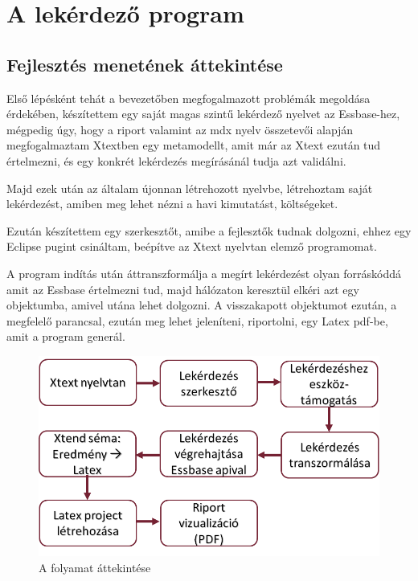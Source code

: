 \chapter{A lekérdező program}\label{sect:Ellaboration}
\section{Fejlesztés menetének áttekintése}
Első lépésként tehát a bevezetőben megfogalmazott problémák megoldása érdekében,
készítettem egy saját magas szintű lekérdező nyelvet az Essbase-hez, mégpedig
úgy, hogy a riport valamint az mdx nyelv összetevői alapján megfogalmaztam
Xtextben egy metamodellt, amit már az Xtext ezután tud értelmezni, és egy
konkrét lekérdezés megírásánál tudja azt validálni.

Majd ezek után az általam újonnan létrehozott nyelvbe, létrehoztam saját
lekérdezést, amiben meg lehet nézni a havi kimutatást, költségeket.

Ezután készítettem egy szerkesztőt, amibe a fejlesztők tudnak dolgozni, ehhez
egy Eclipse pugint csináltam, beépítve az Xtext nyelvtan elemző programomat. 

A program indítás után áttranszformálja a megírt lekérdezést olyan forráskóddá
amit az Essbase értelmezni tud, majd hálózaton keresztül elkéri azt egy
objektumba, amivel utána lehet dolgozni. A visszakapott objektumot ezután, a
megfelelő parancsal, ezután meg lehet jeleníteni, riportolni, egy Latex pdf-be,
amit a program generál.

 \begin{figure}[!ht]
\centering
\includegraphics[width=120mm, keepaspectratio]{figures/overview.png}
\caption{A folyamat áttekintése} 
\label{fig:Overview}
\end{figure}

